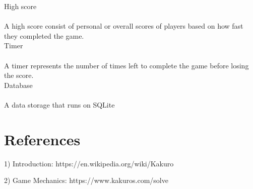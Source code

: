 \documentclass[12pt]{article}
\begin{document}
High score\\\\
A high score consist of personal or overall scores of players based on how fast they completed the game.\\

Timer \\\\
A timer represents the number of times left to complete the game before losing the score.\\

Database\\\\
A data storage that runs on SQLite\\


\newpage

\section{References}

1) Introduction: https://en.wikipedia.org/wiki/Kakuro

2) Game Mechanics: https://www.kakuros.com/solve


\setlength{\parindent}{10ex}
\end{document}
